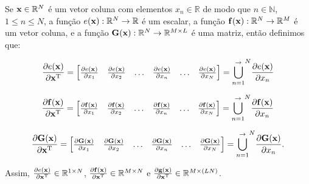\begin{definition}\label{def:deltahor}
Se 
$\VECTOR{x}\in \mathbb{R}^N$ é um vetor coluna com elementos $x_n\in \mathbb{R}$ de modo que
$n\in \mathbb{N}$, $1 \leq n \leq N$, 
a função $e(\VECTOR{x}): \mathbb{R}^N \rightarrow \mathbb{R}$ é um escalar, 
a função $\VECTOR{f}(\VECTOR{x}): \mathbb{R}^N \rightarrow \mathbb{R}^M$ é um vetor coluna,  e
a função $\MATRIX{G}(\VECTOR{x}): \mathbb{R}^N \rightarrow \mathbb{R}^{M\times L}$ é uma matriz, 
então definimos que:

\begin{equation}
\frac{\partial e(\VECTOR{x}) }{\partial \VECTOR{x}^{\transpose}}= 
\left[
\begin{matrix}
\frac{\partial e(\VECTOR{x}) }{\partial x_{1}}&
\frac{\partial e(\VECTOR{x}) }{\partial x_{2}}&
\hdots&
\frac{\partial e(\VECTOR{x}) }{\partial x_{n}}&
\hdots&
\frac{\partial e(\VECTOR{x}) }{\partial x_{N}}
\end{matrix}
\right]= {\bigcup\limits_{n=1}^{\rightarrow}}^{N}{\frac{\partial e(\VECTOR{x}) }{\partial x_{n}}} 
\end{equation}

\begin{equation}
\frac{\partial \VECTOR{f}(\VECTOR{x}) }{\partial \VECTOR{x}^{\transpose}}= 
\left[
\begin{matrix}
\frac{\partial \VECTOR{f}(\VECTOR{x}) }{\partial x_{1}}&
\frac{\partial \VECTOR{f}(\VECTOR{x}) }{\partial x_{2}}&
\hdots&
\frac{\partial \VECTOR{f}(\VECTOR{x}) }{\partial x_{n}}&
\hdots&
\frac{\partial \VECTOR{f}(\VECTOR{x}) }{\partial x_{N}}
\end{matrix}
\right]= {\bigcup\limits_{n=1}^{\rightarrow}}^{N}{\frac{\partial \VECTOR{f}(\VECTOR{x}) }{\partial x_{n}}} 
\end{equation}

\begin{equation}
\frac{\partial \MATRIX{G}(\VECTOR{x}) }{\partial \VECTOR{x}^{\transpose}}= 
\left[
\begin{matrix}
\frac{\partial \MATRIX{G}(\VECTOR{x}) }{\partial x_{1}}&
\frac{\partial \MATRIX{G}(\VECTOR{x}) }{\partial x_{2}}&
\hdots&
\frac{\partial \MATRIX{G}(\VECTOR{x}) }{\partial x_{n}}&
\hdots&
\frac{\partial \MATRIX{G}(\VECTOR{x}) }{\partial x_{N}}
\end{matrix}
\right]= {\bigcup\limits_{n=1}^{\rightarrow}}^{N}{\frac{\partial \MATRIX{G}(\VECTOR{x}) }{\partial x_{n}}}.
\end{equation}

Assim, 
$\frac{\partial e(\VECTOR{x}) }{\partial \VECTOR{x}^{\transpose}} \in \mathbb{R}^{1\times N}$,
$\frac{\partial \VECTOR{f}(\VECTOR{x}) }{\partial \VECTOR{x}^{\transpose}} \in \mathbb{R}^{M \times N}$ e
$\frac{\partial \VECTOR{g}(\VECTOR{x}) }{\partial \VECTOR{x}^{\transpose}} \in \mathbb{R}^{M \times (LN)}$.
\end{definition}


